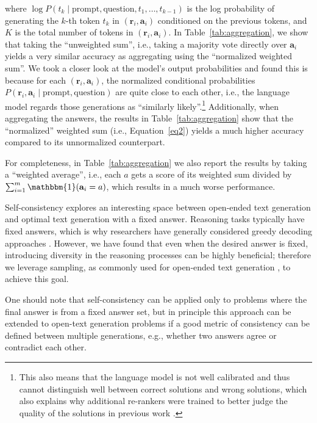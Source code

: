 where $\log P(t_k \mid \text{prompt}, \text{question}, t_1, \ldots, t_{k-1})$ is the log probability of generating the $k$-th token $t_k$ in $(\mathbf{r}_i, \mathbf{a}_i)$ conditioned on the previous tokens, and $K$ is the total number of tokens in $(\mathbf{r}_i, \mathbf{a}_i)$.
In Table~\ref{tab:aggregation}, we show that taking the ``unweighted sum'', i.e., taking a majority vote directly over $\mathbf{a}_i$ yields a very similar accuracy as aggregating using the ``normalized weighted sum''. We took a closer look at the model's output probabilities and found this is because for each $(\mathbf{r}_i, \mathbf{a}_i)$, the normalized conditional probabilities $P(\mathbf{r}_i, \mathbf{a}_i \mid \text{prompt}, \text{question})$ are quite close to each other, i.e., the language model regards those generations as ``similarly likely''.\footnote{This also means that the language model is not well calibrated and thus cannot distinguish well between correct solutions and wrong solutions, which also explains why additional re-rankers were trained to better judge the quality of the solutions in previous work \citep{cobbe2021training,thoppilan2022lamda}.} Additionally, when aggregating the answers, the results in Table~\ref{tab:aggregation} show that the ``normalized'' weighted sum (i.e., Equation~\ref{eq2}) yields a much higher accuracy compared to its unnormalized counterpart.

For completeness, in Table~\ref{tab:aggregation} we also report the results by taking a ``weighted average'', i.e., each $a$ gets a score of its weighted sum divided by $\sum\nolimits_{i=1}^m \mathbbm{1} (\mathbf{a}_i = a)$, which results in a much worse performance.

Self-consistency explores an interesting space between open-ended text generation and optimal text generation with a fixed answer. Reasoning tasks typically have fixed answers, which is why researchers have generally considered greedy decoding approaches  \citep{Radford2019LanguageMA,wei2022chain,palm}. However, we have found that even when the desired answer is fixed, introducing diversity in the reasoning processes can be highly beneficial; therefore we leverage sampling, as commonly used for open-ended text generation \citep{Radford2019LanguageMA,brown2020language,thoppilan2022lamda}, to achieve this goal.

One should note that self-consistency can be applied only to problems where the final answer is from a fixed answer set, but in principle this approach can be extended to open-text generation problems if a good metric of consistency can be defined between multiple generations, e.g., whether two answers agree or contradict each other.

